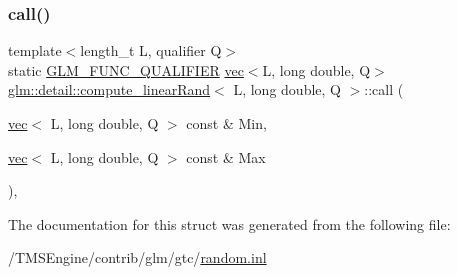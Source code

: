 \subsubsection{\texorpdfstring{call()}{call()}}
{\footnotesize\ttfamily template$<$length\+\_\+t L, qualifier Q$>$ \\
static \hyperlink{setup_8hpp_a33fdea6f91c5f834105f7415e2a64407}{G\+L\+M\+\_\+\+F\+U\+N\+C\+\_\+\+Q\+U\+A\+L\+I\+F\+I\+ER} \hyperlink{structglm_1_1vec}{vec}$<$L, long double, Q$>$ \hyperlink{structglm_1_1detail_1_1compute__linear_rand}{glm\+::detail\+::compute\+\_\+linear\+Rand}$<$ L, long double, Q $>$\+::call (\begin{DoxyParamCaption}\item[{\hyperlink{structglm_1_1vec}{vec}$<$ L, long double, Q $>$ const \&}]{Min,  }\item[{\hyperlink{structglm_1_1vec}{vec}$<$ L, long double, Q $>$ const \&}]{Max }\end{DoxyParamCaption})\hspace{0.3cm}{\ttfamily [inline]}, {\ttfamily [static]}}



The documentation for this struct was generated from the following file\+:\begin{DoxyCompactItemize}
\item 
/\+T\+M\+S\+Engine/contrib/glm/gtc/\hyperlink{random_8inl}{random.\+inl}\end{DoxyCompactItemize}
